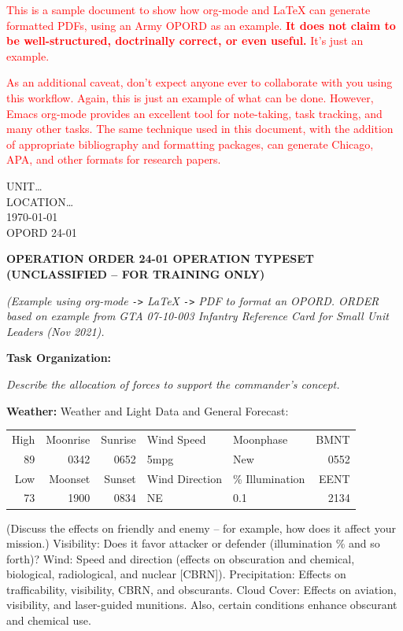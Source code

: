 \documentclass[letterpaper,tgtermes,9pt,microtype,colorlinks=true,urlcolor=blue,DIV=calc,pagesize]{scrartcl}
\author{George Allen}
\date{\today}
\title{}
\newcommand{\classmark}{UNCLASSIFIED -- FOR TRAINING ONLY}
\newcommand{\ordershorttitle}{OPORD 24-01}
\newcommand{\ordertitle}{OPERATION ORDER 24-01 OPERATION TYPESET (\classmark)}
\begin{document}
\textcolor{red}{This is a sample document to show how org-mode and LaTeX can generate formatted PDFs, using an Army OPORD as an example. \textbf{It does not claim to be well-structured, doctrinally correct, or even useful.} It's just an example.}

\textcolor{red}{As an additional caveat, don't expect anyone ever to collaborate with you using this workflow. Again, this is just an example of what can be done. However, Emacs org-mode provides an excellent tool for note-taking, task tracking, and many other tasks. The same technique used in this document, with the addition of appropriate bibliography and formatting packages, can generate Chicago, APA, and other formats for research papers.}

\raggedright

\pagestyle{plain}
\begin{flushright}
UNIT\ldots{}\\
LOCATION\ldots{}\\
\today\\
\ordershorttitle\\
\end{flushright}

\raggedbottom

\textbf{\ordertitle}

\emph{(Example using org-mode \texttt{->} \LaTeX{} \texttt{->} PDF to format an OPORD. ORDER based on example from GTA 07-10-003 Infantry Reference Card for Small Unit Leaders (Nov 2021).}

\textbf{Task Organization:}

\emph{Describe the allocation of forces to support the commander's concept.}

\textbf{Weather:} Weather and Light Data and General Forecast:

\begin{center}
\begin{tabular}{rrrllr}
High & Moonrise & Sunrise & Wind Speed & Moonphase & BMNT\\
89 & 0342 & 0652 & 5mpg & New & 0552\\
Low & Moonset & Sunset & Wind Direction & \% Illumination & EENT\\
73 & 1900 & 0834 & NE & 0.1 & 2134\\
\end{tabular}
\end{center}

(Discuss the effects on friendly and enemy – for example, how does it affect
your mission.) Visibility: Does it favor attacker or defender (illumination \%
and so forth)?  Wind: Speed and direction (effects on obscuration and chemical,
biological, radiological, and nuclear [CBRN]). Precipitation: Effects on
trafficability, visibility, CBRN, and obscurants.  Cloud Cover: Effects on
aviation, visibility, and laser-guided munitions. Also, certain conditions
enhance obscurant and chemical use.
\end{document}
